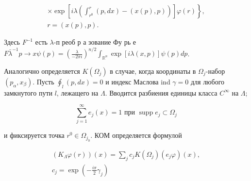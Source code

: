 \documentclass[10pt]{article}
\begin{document}
\[

\begin{gathered}

\left.\times \exp \left[i \lambda\left(\int_{r^{0}}^{r}(p, d x)-(x(p), p)\right)\right] \varphi(r)\right\}, \\

r=(x(p), p) .

\end{gathered}

\]



Здесь $F^{-1}$ есть $\lambda$-п реоб р а зование Фу рь е $F \bar{\lambda}^{-1} p \rightarrow x \psi(p)=\left(\frac{\lambda}{-2 \pi i}\right)^{n / 2} \int_{\mathbb{R}^{n}} \exp [i \lambda(x, p)] \psi(p) d p$.



Аналогично определяется $K\left(\Omega_{j}\right)$ в случае, когда координаты в $\Omega_{j}$-набор $\left(p_{\alpha}, x_{\beta}\right)$. Пусть $\oint_{l}(p, d x)=0$ и индекс Маслова ind $\gamma=0$ для любого замкнутого пути $l$, лежащего на $\Lambda$. Вводится разбиения единицы класса $C^{\infty}$ на $\Lambda$;



\[

\sum_{j=1}^{\infty} e_{j}(x)=1 \text { при } \operatorname{supp} e_{j} \subset \Omega_{j}

\]



и фиксируется точка $r^{0} \in \Omega_{j_{0}}$. КОМ определяется формулой



\[

\begin{gathered}

\left(K_{\Lambda} \varphi(r)\right)(x)=\sum_{j} c_{j} K\left(\Omega_{j}\right)\left(e_{j} \varphi\right)(x), \\

c_{j}=\exp \left(-\frac{i \pi}{2} \gamma_{j}\right)

\end{gathered}

\]
\end{document}
